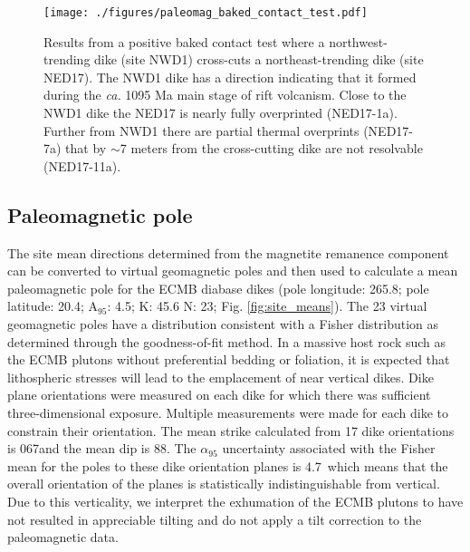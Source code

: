 \documentclass[draft]{agujournal2019}
\begin{document}
\begin{figure}[!ht]
\noindent\texttt{[image: ./figures/paleomag\_baked\_contact\_test.pdf]}
\caption{\small{Results from a positive baked contact test where a northwest-trending dike (site NWD1) cross-cuts a northeast-trending dike (site NED17). The NWD1 dike has a direction indicating that it formed during the \textit{ca.} 1095 Ma main stage of rift volcanism. Close to the NWD1 dike the NED17 is nearly fully overprinted (NED17-1a). Further from NWD1 there are partial thermal overprints (NED17-7a) that by $\sim$7 meters from the cross-cutting dike are not resolvable (NED17-11a).}}
\label{fig:baked_contact}
\end{figure}

\subsection{Paleomagnetic pole}

The site mean directions determined from the magnetite remanence component can be converted to virtual geomagnetic poles and then used to calculate a mean paleomagnetic pole for the ECMB diabase dikes (pole longitude: 265.8; pole latitude: 20.4; A$_{95}$: 4.5; K: 45.6 N: 23; Fig. \ref{fig:site_means}). The 23 virtual geomagnetic poles have a distribution consistent with a Fisher distribution as determined through the  goodness-of-fit method. In a massive host rock such as the ECMB plutons without preferential bedding or foliation, it is expected that lithospheric stresses will lead to the emplacement of near vertical dikes. Dike plane orientations were measured on each dike for which there was sufficient three-dimensional exposure. Multiple measurements were made for each dike to constrain their orientation. The mean strike calculated from 17 dike orientations is 067\textdegree and the mean dip is 88\textdegree. The $\alpha_{95}$ uncertainty associated with the Fisher mean for the poles to these dike orientation planes is 4.7\textdegree\ which means that the overall orientation of the planes is statistically indistinguishable from vertical. Due to this verticality, we interpret the exhumation of the ECMB plutons to have not resulted in appreciable tilting and do not apply a tilt correction to the paleomagnetic data.
\end{document}

